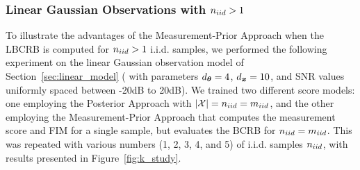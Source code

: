{\subsubsection{%
{%
Linear Gaussian Observations %
with $n_{iid}>1$}}
%
To illustrate the advantages %
of 
{the Measurement-Prior Approach when the LBCRB is computed for} {$n_{iid}>1$} i.i.d. samples, %
%
we performed the following experiment on the linear Gaussian observation model of Section~\ref{sec:linear_model} (%
{with parameters ${d_{\bm{\theta}}}=4$, ${d_{\bm{x}}}=10$,  and SNR values uniformly spaced between -20dB to 20dB}). We trained two different score models: one employing the Posterior Approach {with $|\mathcal{X}|=n_{iid}=m_{iid}$,  %
}
and the other {employing} 
the Measurement-Prior Approach 
{that computes the measurement score and FIM for a single sample, but evaluates the BCRB for $n_{iid}=m_{iid}$. This was repeated} 
with various numbers (1, 2, 3, 4, and 5) of i.i.d. samples %
$n_{iid}$, with
results 
presented in Figure~\ref{fig:k_study}. 

}
